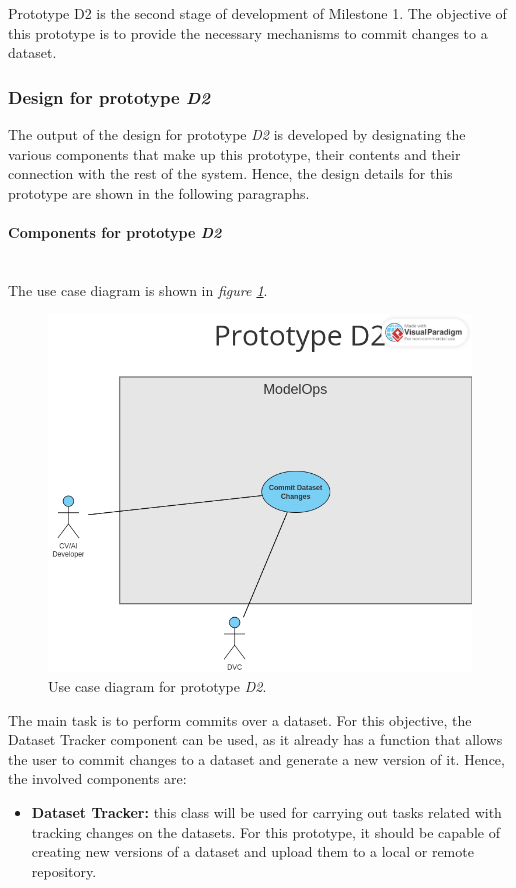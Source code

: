 Prototype D2 is the second stage of development of Milestone 1. The objective of this prototype is to provide the necessary mechanisms to commit changes to a dataset.

\subsubsection{Design for prototype \emph{D2}}

The output of the design for prototype \emph{D2} is developed by designating the various components that make up this prototype, their contents and their connection with the rest of the system.
Hence, the design details for this prototype are shown in the following paragraphs.

\paragraph{Components for prototype \emph{D2}} \mbox{}\\

The use case diagram is shown in \emph{figure \ref{fig:useCaseD2}}.

\begin{figure}[H]
    \centering
    \includegraphics[width=0.7\linewidth]{figs/use-case-D2.png}
    \caption{Use case diagram for prototype \emph{D2}.}
    \label{fig:useCaseD2}
\end{figure}

The main task is to perform commits over a dataset. For this objective, the Dataset Tracker component can be used, as it already has a function that allows the user to 
commit changes to a dataset and generate a new version of it. Hence, the involved components are:

\begin{itemize}
    \item \textbf{Dataset Tracker: }this class will be used for carrying out tasks related with tracking changes on the datasets. For this prototype, it should be capable of creating new versions of a dataset and upload them to a local or remote repository.
\end{itemize}

